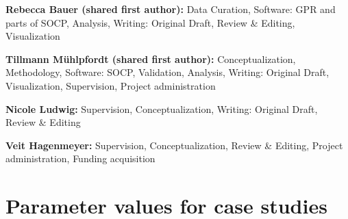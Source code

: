 \documentclass[final,3p,times,twocolumn]{elsarticle}  %
\begin{document}
\textbf{Rebecca Bauer (shared first author):} Data Curation, Software: GPR and parts of SOCP, Analysis, Writing: Original Draft, Review \& Editing, Visualization

\textbf{Tillmann Mühlpfordt (shared first author):} Conceptualization, Methodology, Software: SOCP, Validation, Analysis, Writing: Original Draft, Visualization, Supervision, Project administration

\textbf{Nicole Ludwig:} Supervision, Conceptualization, Writing: Original Draft, Review \& Editing

\textbf{Veit Hagenmeyer:} Supervision, Conceptualization, Review \& Editing, Project administration, Funding acquisition






\clearpage

\appendix

\section{Parameter values for case studies}
\label{app:parameters}
\end{document}

